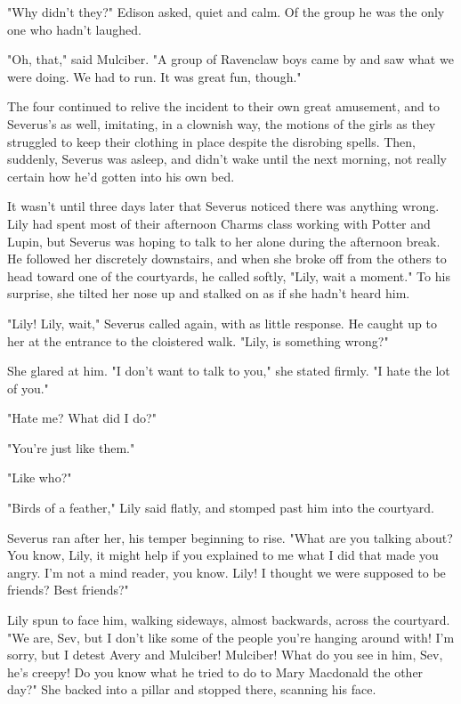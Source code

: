 "Why didn't they?" Edison asked, quiet and calm. Of the group he was the only one who hadn't laughed.

"Oh, that," said Mulciber. "A group of Ravenclaw boys came by and saw what we were doing. We had to run. It was great fun, though."

The four continued to relive the incident to their own great amusement, and to Severus's as well, imitating, in a clownish way, the motions of the girls as they struggled to keep their clothing in place despite the disrobing spells. Then, suddenly, Severus was asleep, and didn't wake until the next morning, not really certain how he'd gotten into his own bed.

It wasn't until three days later that Severus noticed there was anything wrong. Lily had spent most of their afternoon Charms class working with Potter and Lupin, but Severus was hoping to talk to her alone during the afternoon break. He followed her discretely downstairs, and when she broke off from the others to head toward one of the courtyards, he called softly, "Lily, wait a moment." To his surprise, she tilted her nose up and stalked on as if she hadn't heard him.

"Lily! Lily, wait," Severus called again, with as little response. He caught up to her at the entrance to the cloistered walk. "Lily, is something wrong?"

She glared at him. "I don't want to talk to you," she stated firmly. "I hate the lot of you."

"Hate me? What did I do?"

"You're just like them."

"Like who?"

"Birds of a feather," Lily said flatly, and stomped past him into the courtyard.

Severus ran after her, his temper beginning to rise. "What are you talking about? You know, Lily, it might help if you explained to me what I did that made you angry. I'm not a mind reader, you know. Lily! I thought we were supposed to be friends? Best friends?"

Lily spun to face him, walking sideways, almost backwards, across the courtyard. "We are, Sev, but I don't like some of the people you're hanging around with! I'm sorry, but I detest Avery and Mulciber! Mulciber! What do you see in him, Sev, he's creepy! Do you know what he tried to do to Mary Macdonald the other day?" She backed into a pillar and stopped there, scanning his face.

